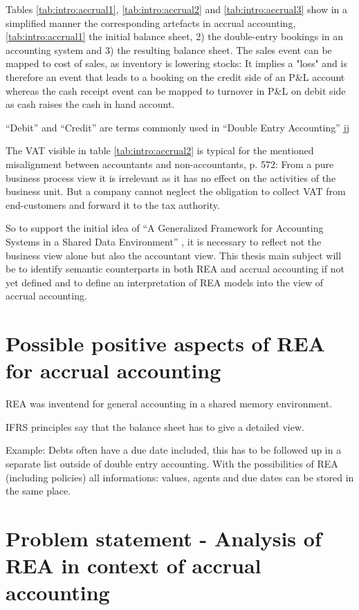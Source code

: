 Tables \ref{tab:intro:accrual1}, \ref{tab:intro:accrual2} and \ref{tab:intro:accrual3} show in a simplified manner the corresponding artefacts in accrual accounting, 
\ref{tab:intro:accrual1} the initial balance sheet, 2) the double-entry bookings in an accounting system and 3) the resulting balance sheet.
The sales event can be mapped to cost of sales, as inventory is lowering stocks:
It implies a "loss" and is therefore an event that leads to a booking on the credit side of an P\&L account whereas the cash receipt event can be mapped to turnover in P\&L on debit side as cash raises the cash in hand account.

\enquote{Debit} and \enquote{Credit} are terms commonly used in \enquote{Double Entry Accounting}  jj


The VAT visible in table \ref{tab:intro:accrual2} is typical for the mentioned misalignment between accountants and non-accountants\cite{mccarthy1982rea}, p. 572:
From a pure business process view it is irrelevant as it has no effect on the activities of the business unit.
But a company cannot neglect the obligation to collect VAT from end-customers and forward it to the tax authority.

So to support the initial idea of \enquote{A Generalized Framework for Accounting Systems in a Shared Data Environment} \cite{mccarthy1982rea}, it is necessary to reflect not the business view alone but also the accountant view.
This thesis main subject will be to identify semantic counterparts in both REA and accrual accounting if not yet defined and to define an interpretation of REA models into the view of accrual accounting.
\section{Possible positive aspects of REA for accrual accounting}
REA was inventend for general accounting in a shared memory environment.

IFRS principles say that the balance sheet has to give a detailed view.

Example: Debts often have a due date included, this has to be followed up in a separate list outside of double entry accounting. With the possibilities of REA (including policies) all informations: values, agents and due dates can be stored in the same place.

\section{Problem statement - Analysis of REA in context of accrual accounting}

